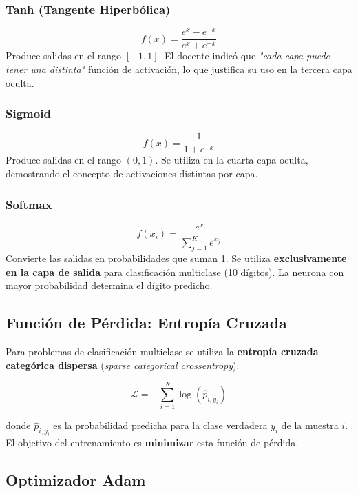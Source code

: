 \documentclass[12pt,a4paper]{article}
\begin{document}
\subsubsection{Tanh (Tangente Hiperbólica)}
\begin{equation}
    f(x) = \frac{e^x - e^{-x}}{e^x + e^{-x}}
\end{equation}
Produce salidas en el rango $[-1, 1]$. El docente indicó que \textit{"cada capa puede tener una distinta"} función de activación, lo que justifica su uso en la tercera capa oculta.

\subsubsection{Sigmoid}
\begin{equation}
    f(x) = \frac{1}{1 + e^{-x}}
\end{equation}
Produce salidas en el rango $(0, 1)$. Se utiliza en la cuarta capa oculta, demostrando el concepto de activaciones distintas por capa.

\subsubsection{Softmax}
\begin{equation}
    f(x_i) = \frac{e^{x_i}}{\sum_{j=1}^{K} e^{x_j}}
\end{equation}
Convierte las salidas en probabilidades que suman 1. Se utiliza \textbf{exclusivamente en la capa de salida} para clasificación multiclase (10 dígitos). La neurona con mayor probabilidad determina el dígito predicho.

\subsection{Función de Pérdida: Entropía Cruzada}

Para problemas de clasificación multiclase se utiliza la \textbf{entropía cruzada categórica dispersa} (\textit{sparse categorical crossentropy}):

\begin{equation}
    \mathcal{L} = -\sum_{i=1}^{N} \log\left(\hat{p}_{i,y_i}\right)
\end{equation}

donde $\hat{p}_{i,y_i}$ es la probabilidad predicha para la clase verdadera $y_i$ de la muestra $i$. El objetivo del entrenamiento es \textbf{minimizar} esta función de pérdida.

\subsection{Optimizador Adam}
\end{document}
